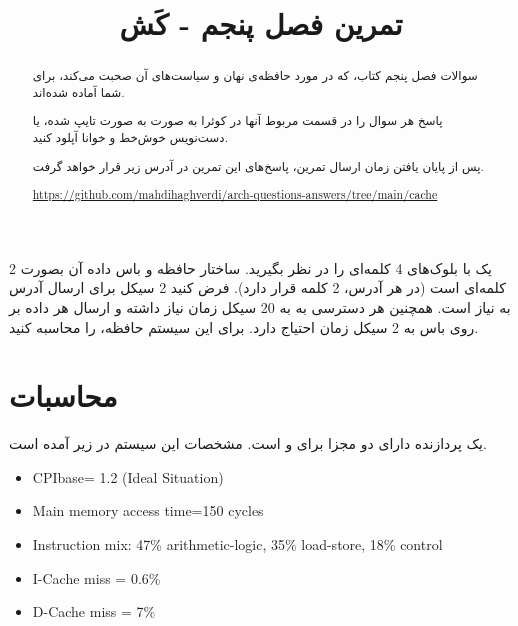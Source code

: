 \documentclass[11pt, dvipsnames, svgnames, x11names]{article}
\title{تمرین فصل پنجم - کَش}
\date{}
\begin{document}
\maketitle    
\begin{abstract}        
سوالات فصل پنجم کتاب، که در مورد حافظه‌ی نهان و سیاست‌های آن صحبت می‌کند، برای شما آماده شده‌اند.

پاسخ هر سوال را در قسمت مربوط آنها در کوئرا به صورت  به صورت تایپ‌ شده، یا دست‌نویس خوش‌خط و خوانا آپلود کنید.               

پس از پایان‌ یافتن زمان ارسال تمرین، پاسخ‌های این تمرین در آدرس زیر قرار خواهد گرفت.
\begin{flushleft}
\url{https://github.com/mahdihaghverdi/arch-questions-answers/tree/main/cache}
\end{flushleft}

\end{abstract}
\tableofcontents

\section{}
یک
با بلوک‌های 4 کلمه‌ای
را در نظر بگیرید.
ساختار حافظه
و باس
داده آن بصورت 2 کلمه‌ای است (در هر آدرس، 2 کلمه قرار دارد). فرض کنید 2 سیکل برای ارسال آدرس به  نیاز است. همچنین هر دسترسی به 
به 20 سیکل زمان نیاز داشته و ارسال هر داده بر روی باس به 2 سیکل زمان احتیاج دارد. برای این سیستم حافظه، 
را محاسبه کنید.

\section{محاسبات}

یک پردازنده دارای دو 
مجزا برای  و  است. مشخصات این سیستم در زیر آمده است.

\begin{latin}
\begin{itemize}
\item CPIbase= 1.2  (Ideal Situation)
\item Main memory access time=150 cycles
\item Instruction mix: 47\% arithmetic-logic, 35\% load-store, 18\% control
\item I-Cache miss = 0.6\%
\item D-Cache miss = 7\%
\end{itemize}
\end{latin}
\end{document}
